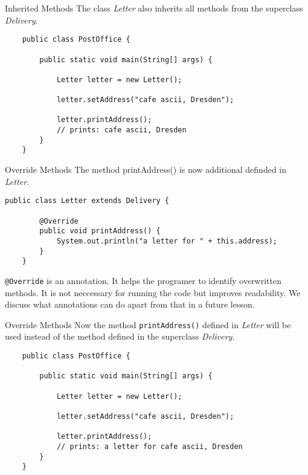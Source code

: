 \begin{frame}[fragile]{Inherited Methods}
    The class \emph{Letter} also inherits all methods from the superclass \emph{Delivery}.
    \begin{lstlisting}
    public class PostOffice {
    
        public static void main(String[] args) {
        
            Letter letter = new Letter();
            
            letter.setAddress("cafe ascii, Dresden");
            
            letter.printAddress();
            // prints: cafe ascii, Dresden
        }    
    } \end{lstlisting}
\end{frame}

\begin{frame}[fragile]{Override Methods}
    The method printAddress() is now additional definded in \emph{Letter}.
    \begin{lstlisting}[escapechar=!]
    public class Letter extends Delivery {
    
        @Override
        public void printAddress() {
            System.out.println("a letter for " + this.address);    
        }    
    } \end{lstlisting}
    \texttt{@Override} is an annotation. 
    It helps the programer to identify overwritten methods.
    It is not neccessary for running the code but improves readability.
    We discuss what annotations can do apart from that in a future lesson.
\end{frame}
\begin{frame}[fragile]{Override Methods}
    Now the method \texttt{printAddress()} defined in \emph{Letter} will be used instead of the method defined
    in the superclass \emph{Delivery}.
    \begin{lstlisting}
    public class PostOffice {
    
        public static void main(String[] args) {
        
            Letter letter = new Letter();
            
            letter.setAddress("cafe ascii, Dresden");
            
            letter.printAddress();
            // prints: a letter for cafe ascii, Dresden
        }    
    } \end{lstlisting}
\end{frame}

